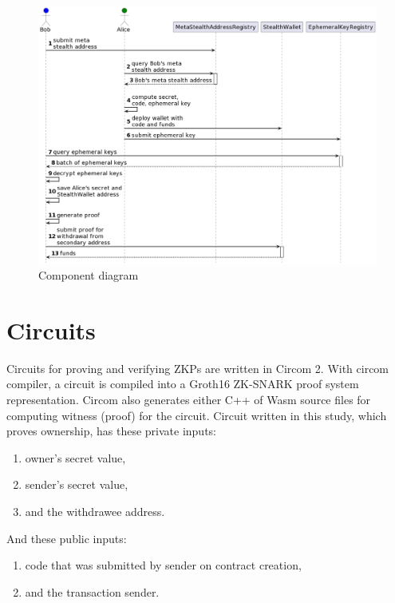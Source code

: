 \begin{figure}[h!]
    \centering
    \includegraphics[width=\textwidth]{assets/images/implementation-flow.png}
    \caption{Component diagram}
    \label{fig:implementation-diagram}
    \vspace{0.5cm}
\end{figure}


\section{Circuits}

Circuits for proving and verifying ZKPs are written in Circom 2\cite{circomCircomDocumentation}.
With circom compiler, a circuit is compiled into a Groth16
ZK-SNARK proof system\cite{Groth16} representation. Circom also generates
either C++ of Wasm source files for computing witness (proof) for the
circuit. Circuit written in this study, which proves ownership, has
these private inputs:
\begin{enumerate}
    \item owner's secret value,
    \item sender's secret value,
    \item and the withdrawee address.
\end{enumerate}
And these public inputs:
\begin{enumerate}
    \item code that was submitted by sender on contract creation,
    \item and the transaction sender.
\end{enumerate}

